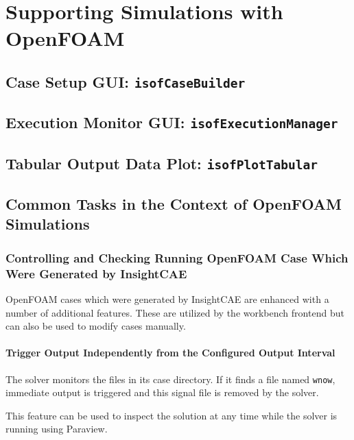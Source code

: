 \section{Supporting Simulations with OpenFOAM}

\subsection{Case Setup GUI: \texttt{isofCaseBuilder}}

\subsection{Execution Monitor GUI: \texttt{isofExecutionManager}}

\subsection{Tabular Output Data Plot: \texttt{isofPlotTabular}}







\subsection{Common Tasks in the Context of OpenFOAM Simulations}

\subsubsection{Controlling and Checking Running OpenFOAM Case Which Were Generated by InsightCAE}

OpenFOAM cases which were generated by InsightCAE are enhanced with a number of additional features.
These are utilized by the workbench frontend but can also be used to modify cases manually.

\paragraph{Trigger Output Independently from the Configured Output Interval}
\label{par:trigger_output_of}
\label{par:wnow}

The solver monitors the files in its case directory.
If it finds a file named \verb!wnow!, immediate output is triggered and this signal file is removed by the solver.

This feature can be used to inspect the solution at any time while the solver is running using Paraview.

